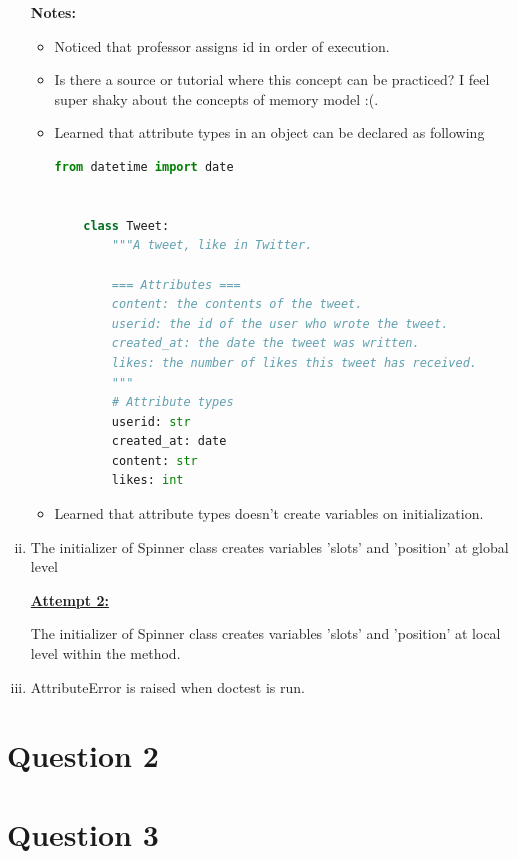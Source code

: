 \documentclass[12pt]{article}
\begin{document}
\begin{enumerate}[i.]
    \bigskip

    \textbf{Notes:}

    \begin{itemize}
    \item Noticed that professor assigns id in order of execution.
    \item Is there a source or tutorial where this concept can be practiced?
    I feel super shaky about the concepts of memory model :(.
    \item Learned that attribute types in an object can be declared as following

    \begin{lstlisting}[language=Python]
    from datetime import date


    class Tweet:
        """A tweet, like in Twitter.

        === Attributes ===
        content: the contents of the tweet.
        userid: the id of the user who wrote the tweet.
        created_at: the date the tweet was written.
        likes: the number of likes this tweet has received.
        """
        # Attribute types
        userid: str
        created_at: date
        content: str
        likes: int
    \end{lstlisting}

    \item Learned that attribute types doesn't create variables on initialization.
    \end{itemize}

    \item The initializer of Spinner class creates variables 'slots' and 'position' at
    global level

    \bigskip

    \begin{mdframed}
        \underline{\textbf{Attempt 2:}}

        \bigskip

        The initializer of Spinner class creates variables 'slots' and 'position' at
    \color{red}local level within the method\color{black}.
    \end{mdframed}

    \item AttributeError is raised when doctest is run.
\end{enumerate}

\section*{Question 2}

\section*{Question 3}
\end{document}
